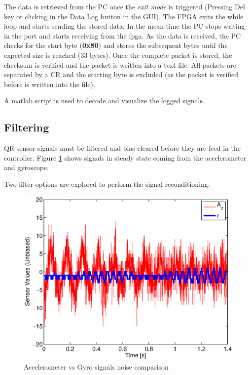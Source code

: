 \documentclass{article}
\begin{document}
The data is retrieved from the PC once the \emph{exit mode} is triggered (Pressing Del key or clicking in the Data Log button in the GUI). The FPGA exits the while loop and starts sending the stored data. In the mean time the PC stops writing in the port and starts receiving from the fpga. As the data is received, the PC checks for the start byte (\textbf{0x80}) and stores the subsequent bytes until the expected size is reached (33 bytes). Once the complete packet is stored, the checksum is verified and the packet is written into a text file. All packets are separated by a CR and the starting byte is excluded (as the packet is verified before is written into the file).

A matlab script is used to decode and visualize the logged signals.


\subsection{Filtering}
\label{sec:filtering}

QR sensor signals must be filtered and bias-cleared before they are feed in the controller. Figure \ref{fig.Noise} shows signals in steady state coming from the accelerometer and gyroscope.

Two filter options are explored to perform the signal reconditioning.

\begin{figure}[ht]
\centering
	\includegraphics[scale=0.6]{Figures/Noise.eps}
	\caption{Accelerometer vs Gyro signals noise comparison}
	\label{fig.Noise}
\end{figure}
\end{document}
